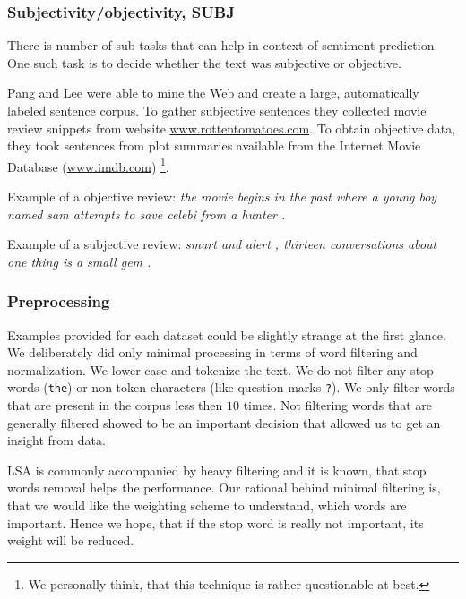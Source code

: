     \* %


    \subsubsection{Subjectivity/objectivity, SUBJ}
    
    There is number of sub-tasks that can help in context of sentiment prediction.
    One such task is to decide whether the text was subjective or objective.
        
    Pang and Lee were able to mine the Web and create a large, automatically labeled sentence corpus. 
    To gather subjective sentences they collected movie review snippets from website  \url{www.rottentomatoes.com}.
    To obtain objective data, they took sentences from plot summaries available from the Internet Movie Database (\url{www.imdb.com}) \cite{pang2004sentimental} \footnote{We personally think, that this technique is rather questionable at best.}.
    
    Example of a objective review:
    \emph{the movie begins in the past where a young boy named sam attempts to save celebi from a hunter .}

    Example of a subjective review:
    \emph{smart and alert , thirteen conversations about one thing is a small gem .}
    

    \subsubsection{Preprocessing} \label{sec:preprocessing}
    
    Examples provided for each dataset could be slightly strange at the first glance.
    We deliberately did only minimal processing in terms of word filtering and normalization.
    We lower-case and tokenize the text. \* %
    We do not filter any stop words (\texttt{the}) or non token characters (like question marks \texttt{?}). 
    We only filter words that are present in the corpus less then $10$ times.
    Not filtering words that are generally filtered showed to be an important decision that allowed us to get an insight from data.
    
    LSA is commonly accompanied by heavy filtering and it is known, that stop words removal helps the performance.
    Our rational behind minimal filtering is, that we would like the weighting scheme to understand, which words are important.
    Hence we hope, that if the stop word is really not important, its weight will be reduced.
    
